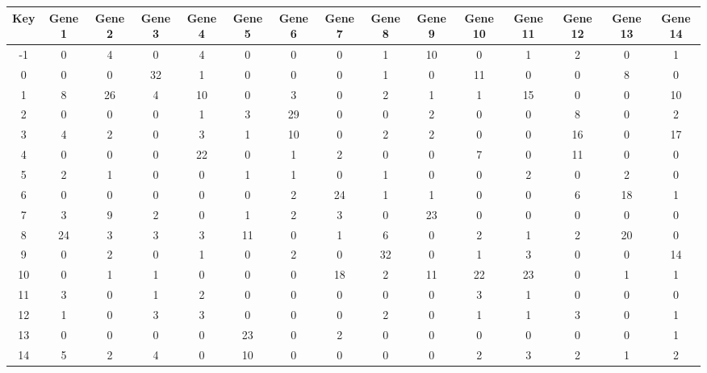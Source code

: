\begin{tabular}{|c|c|c|c|c|c|c|c|c|c|c|c|c|c|c|}
\hline
Key & Gene 1 & Gene 2 & Gene 3 & Gene 4 & Gene 5 & Gene 6 & Gene 7 & Gene 8 & Gene 9 & Gene 10 & Gene 11 & Gene 12 & Gene 13 & Gene 14 \\
\hline
-1 & 0 & 4 & 0 & 4 & 0 & 0 & 0 & 1 & 10 & 0 & 1 & 2 & 0 & 1 \\
0 & 0 & 0 & 32 & 1 & 0 & 0 & 0 & 1 & 0 & 11 & 0 & 0 & 8 & 0 \\
1 & 8 & 26 & 4 & 10 & 0 & 3 & 0 & 2 & 1 & 1 & 15 & 0 & 0 & 10 \\
2 & 0 & 0 & 0 & 1 & 3 & 29 & 0 & 0 & 2 & 0 & 0 & 8 & 0 & 2 \\
3 & 4 & 2 & 0 & 3 & 1 & 10 & 0 & 2 & 2 & 0 & 0 & 16 & 0 & 17 \\
4 & 0 & 0 & 0 & 22 & 0 & 1 & 2 & 0 & 0 & 7 & 0 & 11 & 0 & 0 \\
5 & 2 & 1 & 0 & 0 & 1 & 1 & 0 & 1 & 0 & 0 & 2 & 0 & 2 & 0 \\
6 & 0 & 0 & 0 & 0 & 0 & 2 & 24 & 1 & 1 & 0 & 0 & 6 & 18 & 1 \\
7 & 3 & 9 & 2 & 0 & 1 & 2 & 3 & 0 & 23 & 0 & 0 & 0 & 0 & 0 \\
8 & 24 & 3 & 3 & 3 & 11 & 0 & 1 & 6 & 0 & 2 & 1 & 2 & 20 & 0 \\
9 & 0 & 2 & 0 & 1 & 0 & 2 & 0 & 32 & 0 & 1 & 3 & 0 & 0 & 14 \\
10 & 0 & 1 & 1 & 0 & 0 & 0 & 18 & 2 & 11 & 22 & 23 & 0 & 1 & 1 \\
11 & 3 & 0 & 1 & 2 & 0 & 0 & 0 & 0 & 0 & 3 & 1 & 0 & 0 & 0 \\
12 & 1 & 0 & 3 & 3 & 0 & 0 & 0 & 2 & 0 & 1 & 1 & 3 & 0 & 1 \\
13 & 0 & 0 & 0 & 0 & 23 & 0 & 2 & 0 & 0 & 0 & 0 & 0 & 0 & 1 \\
14 & 5 & 2 & 4 & 0 & 10 & 0 & 0 & 0 & 0 & 2 & 3 & 2 & 1 & 2 \\
\hline
\end{tabular}